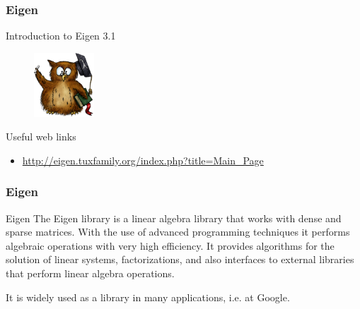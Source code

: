 \documentclass{beamer}
\author{Antonio Cervone}
\date{October 26, 2012}
\institute{Politecnico di Milano}
\begin{document}

\begin{frame}

    \frametitle{Eigen}

    \begin{block}{Introduction to}
        \centering
        Eigen 3.1
    \end{block}

    \begin{figure}
        \centering
        \includegraphics[width=0.2\textwidth]{images/eigen-logo}
    \end{figure}

    \begin{block}{Useful web links}
        \centering
        \begin{itemize}
            \item \url{http://eigen.tuxfamily.org/index.php?title=Main_Page}
        \end{itemize}
    \end{block}

\end{frame}


\begin{frame}

    \frametitle{Eigen}

    \begin{block}{Eigen}
        The Eigen library is a linear algebra library that works with dense and
        sparse matrices. With the use of advanced programming techniques it
        performs algebraic operations with very high efficiency. It provides
        algorithms for the solution of linear systems, factorizations, and also
        interfaces to external libraries that perform linear algebra operations.
    \end{block}

    \vspace{1cm}

    \begin{block}{}
        It is widely used as a library in many applications, i.e. at Google.
    \end{block}

\end{frame}
\end{document}
